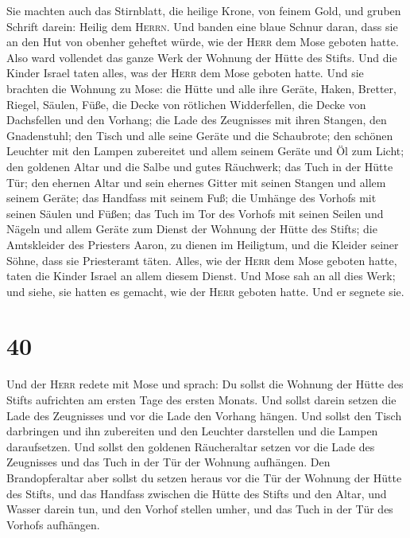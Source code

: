  Sie machten auch das Stirnblatt, die heilige Krone, von
feinem Gold, und gruben Schrift darein: Heilig dem \textsc{Herrn}.
 Und banden eine blaue Schnur daran, dass sie an den Hut
von obenher geheftet würde, wie der \textsc{Herr} dem Mose geboten
hatte.  Also ward vollendet das ganze Werk der Wohnung
der Hütte des Stifts. Und die Kinder Israel taten alles, was der
\textsc{Herr} dem Mose geboten hatte.  Und sie brachten
die Wohnung zu Mose: die Hütte und alle ihre Geräte, Haken, Bretter,
Riegel, Säulen, Füße,  die Decke von rötlichen
Widderfellen, die Decke von Dachsfellen und den Vorhang; 
die Lade des Zeugnisses mit ihren Stangen, den Gnadenstuhl;
 den Tisch und alle seine Geräte und die Schaubrote;
 den schönen Leuchter mit den Lampen zubereitet und allem
seinem Geräte und Öl zum Licht;  den goldenen Altar und
die Salbe und gutes Räuchwerk; das Tuch in der Hütte Tür;
 den ehernen Altar und sein ehernes Gitter mit seinen
Stangen und allem seinem Geräte; das Handfass mit seinem Fuß;
 die Umhänge des Vorhofs mit seinen Säulen und Füßen; das
Tuch im Tor des Vorhofs mit seinen Seilen und Nägeln und allem Geräte
zum Dienst der Wohnung der Hütte des Stifts;  die
Amtskleider des Priesters Aaron, zu dienen im Heiligtum, und die Kleider
seiner Söhne, dass sie Priesteramt täten.  Alles, wie der
\textsc{Herr} dem Mose geboten hatte, taten die Kinder Israel an allem
diesem Dienst.  Und Mose sah an all dies Werk; und siehe,
sie hatten es gemacht, wie der \textsc{Herr} geboten hatte. Und er
segnete sie.

\hypertarget{section-39}{%
\section{40}\label{section-39}}

 Und der \textsc{Herr} redete mit Mose und sprach:
 Du sollst die Wohnung der Hütte des Stifts aufrichten am
ersten Tage des ersten Monats.  Und sollst darein setzen
die Lade des Zeugnisses und vor die Lade den Vorhang hängen.
 Und sollst den Tisch darbringen und ihn zubereiten und
den Leuchter darstellen und die Lampen daraufsetzen.  Und
sollst den goldenen Räucheraltar setzen vor die Lade des Zeugnisses und
das Tuch in der Tür der Wohnung aufhängen.  Den
Brandopferaltar aber sollst du setzen heraus vor die Tür der Wohnung der
Hütte des Stifts,  und das Handfass zwischen die Hütte des
Stifts und den Altar, und Wasser darein tun,  und den
Vorhof stellen umher, und das Tuch in der Tür des Vorhofs aufhängen.

